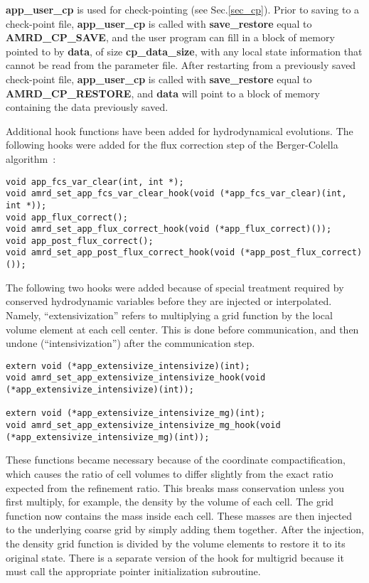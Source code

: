 \documentclass[aps,amssymb,unsortedaddress,nofootinbib]{revtex4}
\begin{document}
{\bf app\_user\_cp} is used for check-pointing (see Sec.\ref{sec_cp}). Prior to saving to 
a check-point file, {\bf app\_user\_cp} is called with {\bf save\_restore} equal to 
{\bf AMRD\_CP\_SAVE}, and the user program can fill in a block of memory pointed to by {\bf data},
of size {\bf cp\_data\_size}, with any local state information that cannot be read from
the parameter file. After restarting from a previously saved check-point file,
{\bf app\_user\_cp} is called with {\bf save\_restore} equal to
{\bf AMRD\_CP\_RESTORE}, and {\bf data} will point to a block of memory containing the
data previously saved.

Additional hook functions have been added for hydrodynamical evolutions.
The following hooks were added for the flux correction step of the 
Berger-Colella algorithm~\cite{berger-colella}:
\begin{verbatim}
void app_fcs_var_clear(int, int *);
void amrd_set_app_fcs_var_clear_hook(void (*app_fcs_var_clear)(int, int *));
void app_flux_correct();
void amrd_set_app_flux_correct_hook(void (*app_flux_correct)());
void app_post_flux_correct();
void amrd_set_app_post_flux_correct_hook(void (*app_post_flux_correct)());
\end{verbatim}


The following two hooks were added because of special treatment required by
conserved hydrodynamic variables before they are injected or interpolated.
Namely, ``extensivization'' refers to multiplying a grid function
by the local volume element at each cell center.  This is done before 
communication, and then undone (``intensivization'') after the communication 
step.  

\begin{verbatim}
extern void (*app_extensivize_intensivize)(int);
void amrd_set_app_extensivize_intensivize_hook(void (*app_extensivize_intensivize)(int));

extern void (*app_extensivize_intensivize_mg)(int);
void amrd_set_app_extensivize_intensivize_mg_hook(void (*app_extensivize_intensivize_mg)(int));
\end{verbatim}

These functions became necessary because of the coordinate compactification,  
which causes the ratio of cell volumes to differ slightly from the exact ratio 
expected from the refinement ratio.  This breaks mass conservation unless you 
first multiply, for example, the density by the volume of each cell.  The grid
function now contains the mass inside each cell.  These masses are then injected 
to the underlying coarse grid by simply adding them together.  After the injection, 
the density grid function is divided by the volume elements to restore it to its 
original state.  There is a separate version of the hook for multigrid because it 
must call the appropriate pointer initialization subroutine.
\end{document}
